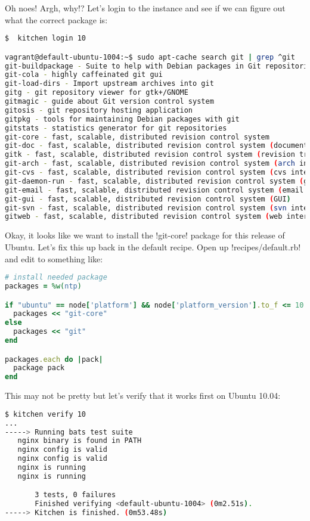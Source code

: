 Oh noes! Argh, why!? Let's login to the instance and see if we can figure out what the correct package is:

\begin{lstlisting}[language=Bash,label=lst:testing-test-kitchen29]
$  kitchen login 10

vagrant@default-ubuntu-1004:~$ sudo apt-cache search git | grep ^git
git-buildpackage - Suite to help with Debian packages in Git repositories
git-cola - highly caffeinated git gui
git-load-dirs - Import upstream archives into git
gitg - git repository viewer for gtk+/GNOME
gitmagic - guide about Git version control system
gitosis - git repository hosting application
gitpkg - tools for maintaining Debian packages with git
gitstats - statistics generator for git repositories
git-core - fast, scalable, distributed revision control system
git-doc - fast, scalable, distributed revision control system (documentation)
gitk - fast, scalable, distributed revision control system (revision tree visualizer)
git-arch - fast, scalable, distributed revision control system (arch interoperability)
git-cvs - fast, scalable, distributed revision control system (cvs interoperability)
git-daemon-run - fast, scalable, distributed revision control system (git-daemon service)
git-email - fast, scalable, distributed revision control system (email add-on)
git-gui - fast, scalable, distributed revision control system (GUI)
git-svn - fast, scalable, distributed revision control system (svn interoperability)
gitweb - fast, scalable, distributed revision control system (web interface)
\end{lstlisting}

Okay, it looks like we want to install the \inline!git-core! package for this release of Ubuntu. Let's fix this up back in the default recipe. Open up \inline!recipes/default.rb! and edit to something like:

\begin{lstlisting}[language=Ruby,label=lst:testing-test-kitchen30]
# install needed package
packages = %w(ntp)

if "ubuntu" == node['platform'] && node['platform_version'].to_f <= 10.04
  packages << "git-core"
else
  packages << "git"
end

packages.each do |pack|
  package pack
end
\end{lstlisting}

This may not be pretty but let's verify that it works first on Ubuntu 10.04:

\begin{lstlisting}[language=Bash,label=lst:testing-test-kitchen31]
$ kitchen verify 10
...
-----> Running bats test suite
   nginx binary is found in PATH
   nginx config is valid                                                    2/3
   nginx config is valid
   nginx is running                                                         3/3
   nginx is running

       3 tests, 0 failures
       Finished verifying <default-ubuntu-1004> (0m2.51s).
-----> Kitchen is finished. (0m53.48s)
\end{lstlisting}

